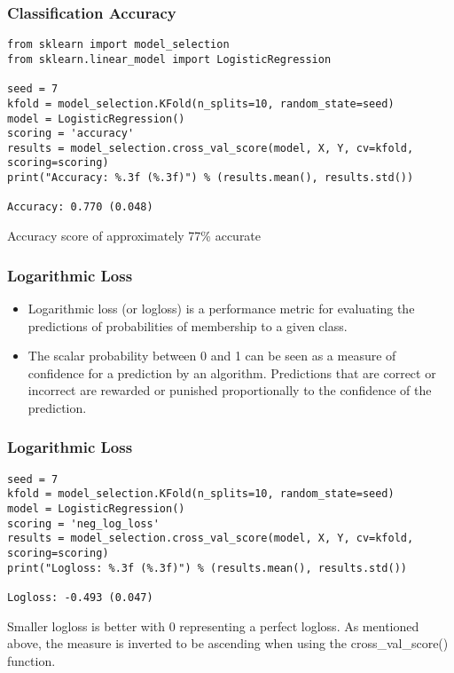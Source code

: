 \begin{frame}[fragile]\frametitle{Classification Accuracy}
\begin{lstlisting}
from sklearn import model_selection
from sklearn.linear_model import LogisticRegression

seed = 7
kfold = model_selection.KFold(n_splits=10, random_state=seed)
model = LogisticRegression()
scoring = 'accuracy'
results = model_selection.cross_val_score(model, X, Y, cv=kfold, scoring=scoring)
print("Accuracy: %.3f (%.3f)") % (results.mean(), results.std())

Accuracy: 0.770 (0.048)
\end{lstlisting}
Accuracy score of approximately 77\% accurate
\end{frame}



\begin{frame}[fragile]\frametitle{Logarithmic Loss}

	\begin{itemize}
	\item Logarithmic loss (or logloss) is a performance metric for evaluating the predictions of probabilities of membership to a given class.
	\item The scalar probability between 0 and 1 can be seen as a measure of confidence for a prediction by an algorithm. Predictions that are correct or incorrect are rewarded or punished proportionally to the confidence of the prediction.
	\end{itemize}
	
\end{frame}

\begin{frame}[fragile]\frametitle{Logarithmic Loss}
\begin{lstlisting}
seed = 7
kfold = model_selection.KFold(n_splits=10, random_state=seed)
model = LogisticRegression()
scoring = 'neg_log_loss'
results = model_selection.cross_val_score(model, X, Y, cv=kfold, scoring=scoring)
print("Logloss: %.3f (%.3f)") % (results.mean(), results.std())

Logloss: -0.493 (0.047)
\end{lstlisting}

Smaller logloss is better with 0 representing a perfect logloss. As mentioned above, the measure is inverted to be ascending when using the cross\_val\_score() function.
\end{frame}




